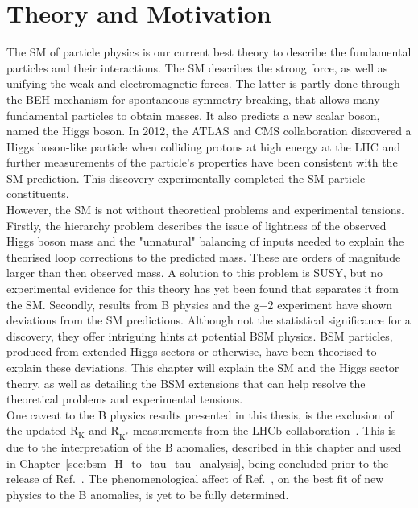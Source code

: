\chapter{Theory and Motivation}
\label{sec:theory}

The \ac{SM} of particle physics is our current best theory to describe the fundamental particles and their interactions.
The \ac{SM} describes the strong force, as well as unifying the weak and electromagnetic forces.
The latter is partly done through the \ac{BEH} mechanism for spontaneous symmetry breaking, that allows many fundamental particles to obtain masses.
It also predicts a new scalar boson, named the Higgs boson.
In 2012, the ATLAS \cite{ATLAS_Higgs_Discovery} and CMS collaboration \cite{CMS_Higgs_Discovery} discovered a Higgs boson-like particle when colliding protons at high energy at the \ac{LHC} and further measurements of the particle's properties have been consistent with the \ac{SM} prediction.
This discovery experimentally completed the \ac{SM} particle constituents. \\

However, the \ac{SM} is not without theoretical problems and experimental tensions.
Firstly, the hierarchy problem describes the issue of lightness of the observed Higgs boson mass and the "unnatural" balancing of inputs needed to explain the theorised loop corrections to the predicted mass. 
These are orders of magnitude larger than then observed mass.
A solution to this problem is \ac{SUSY}, but no experimental evidence for this theory has yet been found that separates it from the \ac{SM}. 
Secondly, results from B physics \cite{LHCb:2021trn,Kowalewski:2013mna,BaBar:2013mob,Belle:2015qfa,LHCb:2015gmp,Belle:2016dyj,LHCb:2017rln,LHCb:2017smo} and the g−2 experiment \cite{Muong-2:2021ojo} have shown deviations from the SM predictions.
Although not the statistical significance for a discovery, they offer intriguing hints at potential \ac{BSM} physics.
\ac{BSM} particles, produced from extended Higgs sectors or otherwise, have been theorised to explain these deviations.
This chapter will explain the \ac{SM} and the Higgs sector theory, as well as detailing the \ac{BSM} extensions that can help resolve the theoretical problems and experimental tensions. \\

One caveat to the B physics results presented in this thesis, is the exclusion of the updated $\text{R}_{\text{K}}$ and $\text{R}_{\text{K}^{*}}$ measurements from the LHCb collaboration~\cite{LHCb:2022zom}.
This is due to the interpretation of the B anomalies, described in this chapter and used in Chapter~\ref{sec:bsm_H_to_tau_tau_analysis}, being concluded prior to the release of Ref.~\cite{LHCb:2022zom}.
The phenomenological affect of Ref.~\cite{LHCb:2022zom}, on the best fit of new physics to the B anomalies, is yet to be fully determined.

